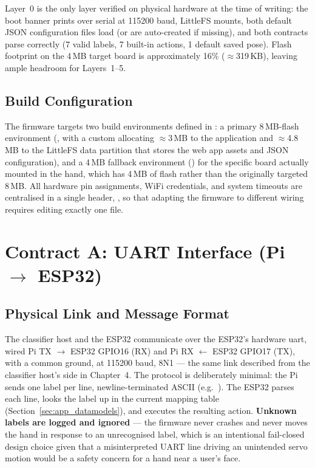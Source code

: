 Layer~0 is the only layer verified on physical hardware at the time
of writing: the boot banner prints over serial at 115200 baud,
LittleFS mounts, both default JSON configuration files load (or are
auto-created if missing), and both contracts parse correctly (7
valid labels, 7 built-in actions, 1 default saved pose). Flash
footprint on the 4\,MB target board is approximately 16\%
($\approx$319\,KB), leaving ample headroom for Layers~1--5.

\subsection{Build Configuration}

The firmware targets two build environments defined in
: a primary 8\,MB-flash environment
(, with a custom 
allocating $\approx$3\,MB to the application and $\approx$4.8\,MB to
the LittleFS data partition that stores the web app assets and JSON
configuration), and a 4\,MB fallback environment
() for the specific board actually mounted in
the hand, which has 4\,MB of flash rather than the originally
targeted 8\,MB. All hardware pin assignments, WiFi credentials, and
system timeouts are centralised in a single header,
, so that adapting the firmware to different
wiring requires editing exactly one file.

\section{Contract A: UART Interface (Pi $\rightarrow$ ESP32)}
\label{sec:app_contracta}

\subsection{Physical Link and Message Format}

The classifier host and the ESP32 communicate over the ESP32's
 hardware \acrshort{uart}, wired Pi TX
$\rightarrow$ ESP32 GPIO16 (RX) and Pi RX $\leftarrow$ ESP32 GPIO17
(TX), with a common ground, at 115200 baud, 8N1 --- the same link
described from the classifier host's side in Chapter~4. The
protocol is deliberately minimal: the Pi sends one
 label per line, newline-terminated
ASCII (e.g.\ ). The ESP32 parses each
line, looks the label up in the current mapping table
(Section~\ref{sec:app_datamodels}), and executes the resulting
action. \textbf{Unknown labels are logged and ignored} --- the
firmware never crashes and never moves the hand in response to an
unrecognised label, which is an intentional fail-closed design
choice given that a misinterpreted UART line driving an unintended
servo motion would be a safety concern for a hand near a user's
face.

